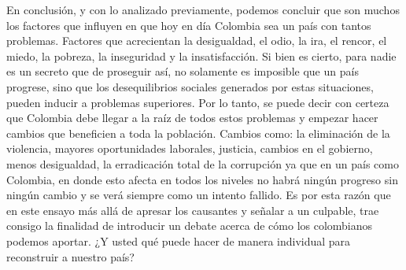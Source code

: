 \documentclass[doc, 12pt, letterpaper, donotrepeattitle, floatsintext, natbib]{apa7}
\begin{document}
En conclusión, y con lo analizado previamente, podemos concluir que son muchos los factores que influyen en que hoy en día Colombia sea un país con tantos problemas. Factores que acrecientan la desigualdad, el odio, la ira, el rencor, el miedo, la pobreza, la inseguridad y la insatisfacción. Si bien es cierto, para nadie es un secreto que de proseguir así, no solamente es imposible que un país progrese, sino que los desequilibrios sociales generados por estas situaciones, pueden inducir a problemas superiores. Por lo tanto, se puede decir con certeza que Colombia debe llegar a la raíz de todos estos problemas y empezar hacer cambios que beneficien a toda la población. Cambios como: la eliminación de la violencia, mayores oportunidades laborales, justicia, cambios en el gobierno, menos desigualdad, la erradicación total de la corrupción ya que en un país como Colombia, en donde esto afecta en todos los niveles no habrá ningún progreso sin ningún cambio y se verá siempre como un intento fallido. Es por esta razón que en este ensayo más allá de apresar los causantes y señalar a un culpable, trae consigo la finalidad de introducir un debate acerca de cómo los colombianos podemos aportar. ¿Y usted qué puede hacer de manera individual para reconstruir a nuestro país?


\newpage
\renewcommand\refname{\large\textbf{Referencias bibliográficas:}}

\end{document}
